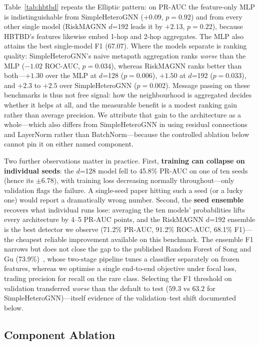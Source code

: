 \documentclass[conference]{IEEEtran}
\begin{document}
Table~\ref{tab:hbtbd} repeats the Elliptic pattern: on PR-AUC the
feature-only MLP is indistinguishable from SimpleHeteroGNN ($+0.09$,
$p=0.92$) and from every other single model (RiskMAGNN $d$=192 leads it by
$+2.13$, $p=0.22$), because HBTBD's features likewise embed 1-hop and 2-hop
aggregates. The MLP also attains the best single-model F1 ($67.07$). Where
the models separate is ranking quality: SimpleHeteroGNN's naive metapath
aggregation ranks \emph{worse} than the MLP ($-1.02$ ROC-AUC, $p=0.034$),
whereas RiskMAGNN ranks better than both---$+1.30$ over the MLP at $d$=128
($p=0.006$), $+1.50$ at $d$=192 ($p=0.033$), and $+2.3$ to $+2.5$ over
SimpleHeteroGNN ($p=0.002$). Message passing on these benchmarks is thus not
free signal: how the neighbourhood is aggregated decides whether it helps at
all, and the measurable benefit is a modest ranking gain rather than average
precision. We attribute that gain to the architecture as a whole---which also
differs from SimpleHeteroGNN in using residual connections and LayerNorm
rather than BatchNorm---because the controlled ablation below cannot pin it
on either named component.

Two further observations matter in practice. First, \textbf{training can
collapse on individual seeds}: the $d$=128 model fell to 45.8\% PR-AUC on one
of ten seeds (hence its $\pm 6.78$), with training loss decreasing normally
throughout---only validation flags the failure. A single-seed paper hitting
such a seed (or a lucky one) would report a dramatically wrong number.
Second, the \textbf{seed ensemble} recovers what individual runs lose:
averaging the ten models' probabilities lifts every architecture by 4--5
PR-AUC points, and the RiskMAGNN $d$=192 ensemble is the best detector we
observe (71.2\% PR-AUC, 91.2\% ROC-AUC, 68.1\% F1)---the cheapest reliable
improvement available on this benchmark. The ensemble F1 narrows but does not
close the gap to the published Random Forest of Song and Gu
(73.9\%)~\cite{song2023}, whose two-stage pipeline tunes a classifier
separately on frozen features, whereas we optimise a single end-to-end
objective under focal loss, trading precision for recall on the rare class.
Selecting the F1 threshold on validation transferred \emph{worse} than the
default to test ($59.3$ vs $63.2$ for SimpleHeteroGNN)---itself evidence of
the validation--test shift documented below.

\subsection{Component Ablation}
\end{document}
